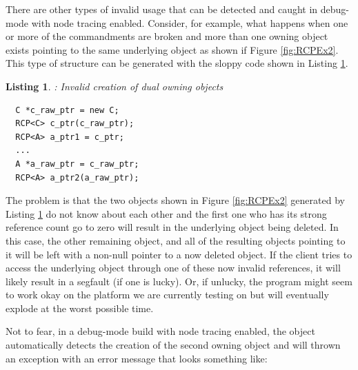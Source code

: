 \documentclass[pdf,ps2pdf,11pt]{SANDreport}
\newtheorem{listing}{Listing}
\begin{document}
There are other types of invalid usage that can be detected and caught
in debug-mode with node tracing enabled.  Consider, for example, what
happens when one or more of the commandments are broken and more than
one owning {} object exists pointing to the same
underlying {} object as shown if Figure
{}\ref{fig:RCPEx2}.  This type of structure can be generated with the
sloppy code shown in Listing {}\ref{listing:duplicate_owning_rcp}.

{}\begin{listing}: Invalid creation of dual owning {}
objects
\label{listing:duplicate_owning_rcp}
{\small\begin{verbatim}
  C *c_raw_ptr = new C;
  RCP<C> c_ptr(c_raw_ptr);
  RCP<A> a_ptr1 = c_ptr;
  ...
  A *a_raw_ptr = c_raw_ptr;
  RCP<A> a_ptr2(a_raw_ptr);
\end{verbatim}}
\end{listing}

The problem is that the two {} objects shown in
Figure {}\ref{fig:RCPEx2} generated by Listing
{}\ref{listing:duplicate_owning_rcp} do not know about each other and
the first one who has its strong reference count go to zero will
result in the underlying {} object being deleted.  In this
case, the other remaining {} object, and all of
the resulting {} objects pointing to it will be left with a
non-null pointer to a now deleted {} object.  If the client
tries to access the underlying object through one of these now invalid
references, it will likely result in a segfault (if one is lucky).
Or, if unlucky, the program might seem to work okay on the platform we
are currently testing on but will eventually explode at the worst
possible time.

Not to fear, in a debug-mode build with node tracing enabled, the
{} object automatically detects the creation of
the second owning {} object and will thrown an
exception with an error message that looks something like:
\end{document}
